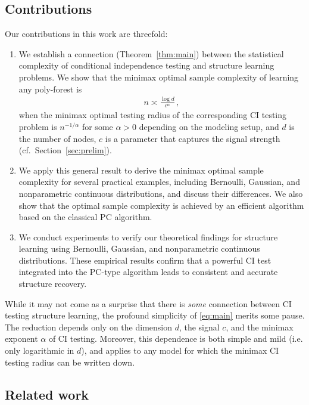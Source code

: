 \documentclass{article}
\theoremstyle{definition}
\theoremstyle{definition}
\theoremstyle{definition}
\theoremstyle{definition}
\theoremstyle{definition}
\theoremstyle{definition}
\theoremstyle{remark}
\theoremstyle{remark}
\newcommand{\dd}{d}
\begin{document}
\subsection{Contributions}
Our contributions in this work are threefold:
\begin{enumerate}
    \item We establish a connection (Theorem~\ref{thm:main}) between the statistical complexity of conditional independence testing and structure learning problems.
    We show that the minimax optimal sample complexity of learning any poly-forest is
    \begin{align}
    \label{eq:main}
        n\asymp \frac{\log d}{c^\alpha}\,,
    \end{align}
    when the minimax optimal testing radius of the corresponding CI testing problem is $n^{-1/\alpha}$ for some $\alpha>0$ depending on the modeling setup, and $\dd$ is the number of nodes, $c$ is a parameter that captures the signal strength (cf.~Section~\ref{sec:prelim}).
    
    \item We apply this general result to derive the minimax optimal sample complexity for several practical examples, including Bernoulli, Gaussian, and nonparametric continuous distributions, and discuss their differences. 
    We also show that the optimal sample complexity is achieved by an efficient algorithm based on the classical PC algorithm. 

    \item We conduct experiments to verify our theoretical findings for structure learning using Bernoulli, Gaussian, and nonparametric continuous distributions. These empirical results confirm that a powerful CI test integrated into the PC-type algorithm leads to consistent and accurate structure recovery.
\end{enumerate}
While it may not come as a surprise that there is \emph{some} connection between CI testing structure learning, the profound simplicity of \eqref{eq:main} merits some pause. The reduction depends only on the dimension $d$, the signal $c$, and the minimax exponent $\alpha$ of CI testing. Moreover, this dependence is both simple and mild (i.e. only logarithmic in $d$), and applies to any model for which the minimax CI testing radius can be written down.


\subsection{Related work}
\end{document}
